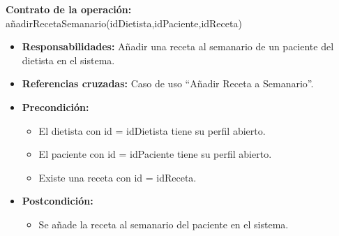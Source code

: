 \textbf{Contrato de la operación:} añadirRecetaSemanario(idDietista,idPaciente,idReceta)
\begin{itemize}
\item \textbf{Responsabilidades:} Añadir una receta al semanario de un paciente del dietista en el sistema.
\item \textbf{Referencias cruzadas:} Caso de uso ``Añadir Receta a Semanario''.
\item \textbf{Precondición:}
\begin{itemize}
\item El dietista con id = idDietista tiene su perfil abierto.
\item El paciente con id = idPaciente tiene su perfil abierto.
\item Existe una receta con id = idReceta.
\end{itemize}
\item \textbf{Postcondición:}
\begin{itemize}
\item Se añade la receta al semanario del paciente en el sistema.
\end{itemize}
\end{itemize}


